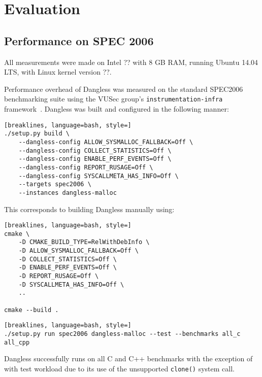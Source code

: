\chapter{Evaluation}

\section{Performance on SPEC 2006}

All measurements were made on Intel ?? with 8 GB RAM, running Ubuntu 14.04 LTS, with Linux kernel version ??.

Performance overhead of Dangless was measured on the standard SPEC2006 benchmarking suite using the VUSec group's \texttt{instrumentation-infra} framework~\cite{vusec-infra}. Dangless was built and configured in the following manner:

\begin{lstlisting}[breaklines, language=bash, style=]
./setup.py build \
	--dangless-config ALLOW_SYSMALLOC_FALLBACK=Off \
	--dangless-config COLLECT_STATISTICS=Off \
	--dangless-config ENABLE_PERF_EVENTS=Off \
	--dangless-config REPORT_RUSAGE=Off \
	--dangless-config SYSCALLMETA_HAS_INFO=Off \
	--targets spec2006 \
	--instances dangless-malloc
\end{lstlisting}

This corresponds to building Dangless manually using:

\begin{lstlisting}[breaklines, language=bash, style=]
cmake \
	-D CMAKE_BUILD_TYPE=RelWithDebInfo \
	-D ALLOW_SYSMALLOC_FALLBACK=Off \
	-D COLLECT_STATISTICS=Off \
	-D ENABLE_PERF_EVENTS=Off \
	-D REPORT_RUSAGE=Off \
	-D SYSCALLMETA_HAS_INFO=Off \
	..

cmake --build .
\end{lstlisting}

\begin{lstlisting}[breaklines, language=bash, style=]
./setup.py run spec2006 dangless-malloc --test --benchmarks all_c all_cpp
\end{lstlisting}

Dangless successfully runs on all C and C++ benchmarks with the exception of  with test workload due to its use of the unsupported \lstinline!clone()! system call. 

